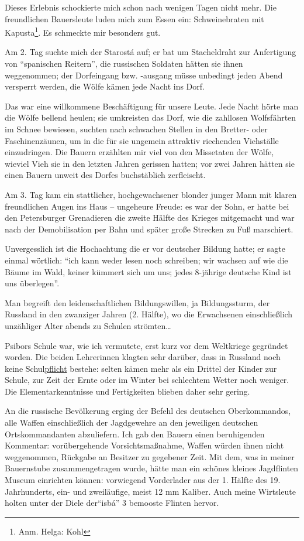 Dieses Erlebnis schockierte mich schon nach wenigen Tagen nicht mehr. Die freundlichen Bauersleute luden mich zum Essen ein: Schweinebraten mit Kapusta\footnote{Anm. Helga: Kohl}. Es schmeckte mir besonders gut.

Am 2. Tag suchte mich der Starostá auf; er bat um Stacheldraht zur Anfertigung von \enquote{spanischen Reitern}, die russischen Soldaten hätten sie ihnen weggenommen; der Dorfeingang bzw. -ausgang müsse unbedingt jeden Abend versperrt werden, die Wölfe kämen jede Nacht ins Dorf.

Das war eine willkommene Beschäftigung für unsere Leute. Jede Nacht hörte man die Wölfe bellend heulen; sie umkreisten das Dorf, wie die zahllosen Wolfsfährten im Schnee bewiesen, suchten nach schwachen Stellen in den Bretter- oder Faschinenzäunen, um in die für sie ungemein attraktiv riechenden Viehställe einzudringen. Die Bauern erzählten mir viel von den Missetaten der Wölfe, wieviel Vieh sie in den letzten Jahren gerissen hatten; vor zwei Jahren hätten sie einen Bauern unweit des Dorfes buchstäblich zerfleischt.

Am 3. Tag kam ein stattlicher, hochgewachsener blonder junger Mann mit klaren freundlichen Augen ins Haus -- ungeheure Freude: es war der Sohn, er hatte bei den Petersburger Grenadieren die zweite Hälfte des Krieges mitgemacht und war nach der Demobilisation per Bahn und später große Strecken zu Fuß marschiert.

Unvergesslich ist die Hochachtung die er vor deutscher Bildung hatte; er sagte einmal wörtlich: \enquote{ich kann weder lesen noch schreiben; wir wachsen auf wie die Bäume im Wald, keiner kümmert sich um uns; jedes 8-jährige deutsche Kind ist uns überlegen}.

Man begreift den leidenschaftlichen Bildungswillen, ja Bildungssturm, der Russland in den zwanziger Jahren (2. Hälfte), wo die Erwachsenen einschließlich unzähliger Alter abends zu Schulen strömten\dots

Psibors Schule war, wie ich vermutete, erst kurz vor dem Weltkriege gegründet worden. Die beiden Lehrerinnen klagten sehr darüber, dass in Russland noch keine Schul\underline{pflicht} bestehe: selten kämen mehr als ein Drittel der Kinder zur Schule, zur Zeit der Ernte oder im Winter bei schlechtem Wetter noch weniger. Die Elementarkenntnisse und Fertigkeiten blieben daher sehr gering.

An die russische Bevölkerung erging der Befehl des deutschen Oberkommandos, alle Waffen einschließlich der Jagdgewehre an den jeweiligen deutschen Ortskommandanten abzuliefern. Ich gab den Bauern einen beruhigenden Kommentar: vorübergehende Vorsichtsmaßnahme, Waffen würden ihnen nicht weggenommen, Rückgabe an Besitzer zu gegebener Zeit. Mit dem, was in meiner Bauernstube zusammengetragen wurde, hätte man ein schönes kleines Jagdflinten Museum einrichten können: vorwiegend Vorderlader aus der 1. Hälfte des 19. Jahrhunderts, ein- und zweiläufige, meist 12 mm Kaliber. Auch meine Wirtsleute holten unter der Diele der\enquote{isbá} 3 bemooste Flinten hervor.

